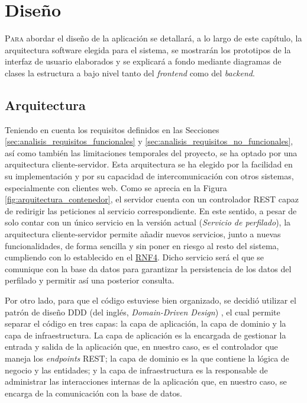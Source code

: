 \chapter{Diseño}
\label{chap:diseño}

\lettrine{P}{ara} abordar el diseño de la aplicación se detallará, a lo largo de este capítulo, la arquitectura software elegida para el sistema,
se mostrarán los prototipos de la interfaz de usuario elaborados y se explicará a fondo mediante diagramas de clases la estructura a bajo nivel
tanto del \textit{frontend} como del \textit{backend}.

\section{Arquitectura}
\label{sec:diseño_arquitectura}

Teniendo en cuenta los requisitos definidos en las Secciones \ref{sec:analisis_requisitos_funcionales} y \ref{sec:analisis_requisitos_no_funcionales},
así como también las limitaciones temporales del proyecto, se ha optado por una arquitectura cliente-servidor. Esta arquitectura se ha elegido
por la facilidad en su implementación y por su capacidad de intercomunicación con otros sistemas, especialmente con clientes web. Como
se aprecia en la Figura \ref{fig:arquitectura_contenedor}, el servidor cuenta con un controlador REST capaz de redirigir las peticiones al servicio
correspondiente. En este sentido, a pesar de solo contar con un único servicio en la versión actual (\textit{Servicio de perfilado}),
la arquitectura cliente-servidor permite añadir nuevos servicios, junto a nuevas funcionalidades, de forma sencilla y sin poner en riesgo al resto del sistema,
cumpliendo con lo establecido en el \hyperref[req:rnf4]{RNF4}.
Dicho servicio será el que se comunique con la base da datos para garantizar la persistencia de los datos del perfilado y permitir así
una posterior consulta.

\bigskip
Por otro lado, para que el código estuviese bien organizado, se decidió utilizar el patrón de diseño DDD (del inglés, \textit{Domain-Driven Design}) \cite{ddd}, el cual
permite separar el código en tres capas: la capa de aplicación, la capa de dominio y la capa de infraestructura. La capa de aplicación es la encargada de gestionar
la entrada y salida de la aplicación que, en nuestro caso, es el controlador que maneja los \textit{endpoints} REST; la capa de dominio es la que contiene la lógica
de negocio y las entidades; y la capa de infraestructura es la responsable de administrar las interacciones internas de la aplicación que, en nuestro
caso, se encarga de la comunicación con la base de datos.

